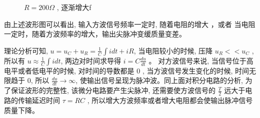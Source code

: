 \documentclass[UTF8]{ctexart}
\begin{document}
\begin{figure}[htbp]
    \centering
    \quad   
    \caption{$R=200 \Omega$ , 逐渐增大f}
    \label{fig.1}
\end{figure}

由上述波形图可以看出, 输入方波信号频率一定时, 随着电阻的增大 ，或者 当电阻一定时，随着方波频率的增大，输出尖脉冲变缓质量变差。

理论分析可知,  $u=u_{C}+u_{R}=\frac{1}{C} \int i d t+i R $,
当电阻较小的时候, 压降 $ u_{R}<<u_{C}$ , 所以有 
$u \approx \frac{1}{C} \int i d t$, 
两边对时间求导得 $i=C \frac{d u}{d t}$  。
对方波信号来说, 当信号位于高电平或者低电平的时候, 对时间的导数都是 0 , 
当方波信号发生变化的时候, 时间无限趋于 0, 所以 $ \frac{d u}{d t} \rightarrow \infty $, 
使输出信号呈现为脉冲波。同上面对积分电路的分析, 为了保证波形的完整性, 该微分电路要产生尖脉冲,
还需要使方波信号的  $\frac{T}{2} $ 远大于电路的传输延迟时间  $\tau=R C$ , 
所以增大方波频率或者增大电阻都会使输出脉冲信号质量下降。
\end{document}
